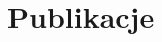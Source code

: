 \documentclass[11pt,a4paper,sans]{moderncv}        %
\begin{document}
% 

\section{Publikacje}
\renewcommand*{\bibliographyhead}[1]{}
\nocite{konferencja}


\end{document}
